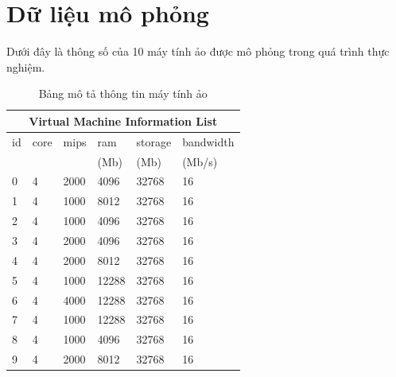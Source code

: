 \documentclass{my_style}
\begin{document}
\section{Dữ liệu mô phỏng}
Dưới đây là thông số của 10 máy tính ảo được mô phỏng trong quá trình thực nghiệm. \\
\begin{table}[h!]
\centering
\caption{Bảng mô tả thông tin máy tính ảo}
\begin{tabular}{| p{1cm} | p{1cm} | p{1cm} | p{1.2cm} | p{1.2cm} | p{2cm} |}
	\hline
	\multicolumn{6}{|c|}{Virtual Machine Information List} \\
	\hline
	id & core	& mips & ram & storage & bandwidth \\
	   &       &      & (Mb)  & (Mb)   & (Mb/s) \\
	\hline
	\hline
	0&4 & 2000 & 4096 & 32768 & 16 \\
	\hline
	1&4&1000&8012&32768&16 \\
	\hline
	2&4&1000&4096&32768&16\\
	\hline
	3&4&2000&4096&32768&16\\
	\hline
	4&4&2000&8012&32768&16\\
	\hline
	5&4&1000&12288&32768&16\\
	\hline
	6&4&4000&12288&32768&16\\
	\hline
	7&4&1000&12288&32768&16\\
	\hline
	8&4&1000&4096&32768&16\\
	\hline
	9&4&2000&8012&32768&16\\
	\hline
\end{tabular}
\label{table:vm_info}
\end{table}
\end{document}
